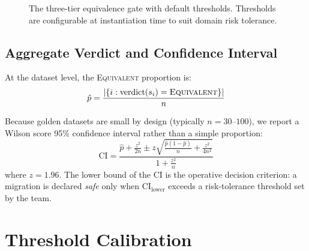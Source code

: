 \documentclass[11pt,a4paper]{article}
\begin{document}
\begin{figure}[h]
\centering
{}
\caption{The three-tier equivalence gate with default thresholds.
Thresholds are configurable at instantiation time to suit domain risk tolerance.}
\label{fig:gate}
\end{figure}

\subsection{Aggregate Verdict and Confidence Interval}

At the dataset level, the \textsc{Equivalent} proportion is:
\begin{equation}
  \hat{p} = \frac{|\{i : \text{verdict}(s_i) = \textsc{Equivalent}\}|}{n}
\end{equation}

Because golden datasets are small by design (typically $n = 30$--$100$), we report
a Wilson score 95\% confidence interval \citep{wilson1927} rather than a simple
proportion:
\begin{equation}
  \text{CI} = \frac{\hat{p} + \frac{z^2}{2n} \pm z\sqrt{\frac{\hat{p}(1-\hat{p})}{n} + \frac{z^2}{4n^2}}}{1 + \frac{z^2}{n}}
\end{equation}
where $z = 1.96$.
The lower bound of the CI is the operative decision criterion: a migration is
declared \emph{safe} only when $\text{CI}_\text{lower}$ exceeds a risk-tolerance
threshold set by the team.

\section{Threshold Calibration}
\label{sec:calibration}
\end{document}
